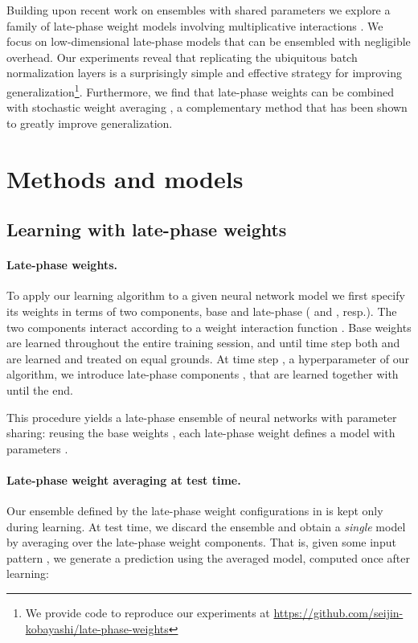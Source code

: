 \documentclass{article} \usepackage{iclr2021_conference,times}
\begin{document}
Building upon recent work on ensembles with shared parameters \citep{wen_batchensemble_2020} we explore a family of late-phase weight models involving multiplicative interactions \citep{jayakumar_multiplicative_2020}. We focus on low-dimensional late-phase models that can be ensembled with negligible overhead. Our experiments reveal that replicating the ubiquitous batch normalization layers \citep{ioffe_batch_2015} is a surprisingly simple and effective strategy for improving generalization\footnote{We provide code to reproduce our experiments at \url{https://github.com/seijin-kobayashi/late-phase-weights}}. Furthermore, we find that late-phase weights can be combined with stochastic weight averaging \citep[][]{izmailov_averaging_2018}, a complementary method that has been shown to greatly improve generalization.

\section{Methods and models}

\subsection{Learning with late-phase weights}
\paragraph{Late-phase weights.} To apply our learning algorithm to a given neural network model  we first specify its weights  in terms of two components, base and late-phase ( and , resp.). The two components interact according to a weight interaction function . Base weights are learned throughout the entire training session, and until time step  both  and  are learned and treated on equal grounds. At time step , a hyperparameter of our algorithm, we introduce  late-phase components , that are learned together with  until the end.

This procedure yields a late-phase ensemble of  neural networks with parameter sharing: reusing the base weights , each late-phase weight  defines a model with parameters .

\paragraph{Late-phase weight averaging at test time.} Our ensemble defined by the  late-phase weight configurations in  is kept only during learning. At test time, we discard the ensemble and obtain a \emph{single} model by averaging over the  late-phase weight components. That is, given some input pattern , we generate a prediction  using the averaged model, computed once after learning:
\end{document}

